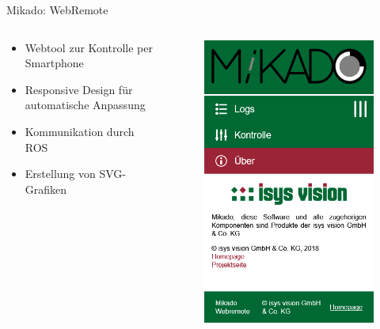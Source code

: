 \documentclass[xcolor=dvipsnames]{beamer}
\begin{document}
\begin{frame}{Mikado: WebRemote}
\begin{columns}
\begin{column}{0.7\textwidth}
\begin{itemize}
\item Webtool zur Kontrolle per Smartphone
\item Responsive Design für automatische Anpassung
\item Kommunikation durch ROS\footnotemark[1]
\item Erstellung von SVG-Grafiken
\end{itemize}
\end{column}
\begin{column}{0.3\textwidth}
\begin{figure}[t]
\includegraphics[width=\textwidth]{media/webremote-info.png}
\end{figure}
\end{column}
\end{columns}
\end{frame}
\end{document}
